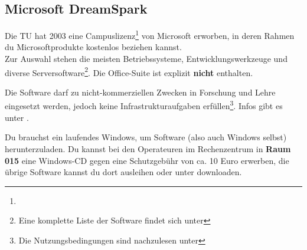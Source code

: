 \subsection{Microsoft DreamSpark}
	\label{msdnaa}
	Die TU hat  2003 eine Campuslizenz\footnote{} von Microsoft erworben, in deren Rahmen du Microsoftprodukte kostenlos beziehen kannst.\\ 
	Zur Auswahl stehen die meisten Betriebssysteme, Entwicklungswerkzeuge und diverse Serversoftware\footnote{\sloppy Eine komplette Liste der Software findet sich unter }. Die Office-Suite ist explizit \textbf{nicht} enthalten.

	Die Software darf zu nicht-kommerziellen Zwecken in Forschung und Lehre eingesetzt werden, jedoch keine Infrastrukturaufgaben erfüllen\footnote{Die Nutzungsbedingungen sind nachzulesen unter }. Infos gibt es unter .

	Du brauchst ein laufendes Windows, um Software (also auch
	Windows selbst) herunterzuladen. Du kannst  bei den Operateuren
	im Rechenzentrum in \textbf{Raum 015} eine Windows-CD gegen eine Schutzgebühr von ca. 10 Euro erwerben, die übrige Software kannst du dort ausleihen oder unter  downloaden.
